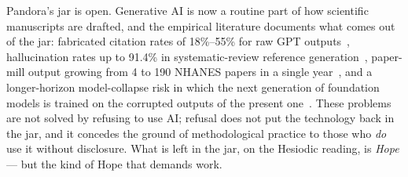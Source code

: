\documentclass[11pt,a4paper]{article}
\begin{document}
Pandora's jar is open. Generative AI is now a routine part of how
scientific manuscripts are drafted, and the empirical literature
documents what comes out of the jar: fabricated citation rates of
18\%--55\% for raw GPT outputs~\citep{walters2023fabricated},
hallucination rates up to 91.4\% in systematic-review reference
generation~\citep{chelli2024hallucination}, paper-mill output growing
from 4 to 190 NHANES papers in a single
year~\citep{suchak2025nhanes}, and a longer-horizon model-collapse
risk in which the next generation of foundation models is trained on
the corrupted outputs of the present
one~\citep{shumailov2024modelcollapse, seddik2024collapse}. These
problems are not solved by refusing to use AI; refusal does not put the
technology back in the jar, and it concedes the ground of methodological
practice to those who \emph{do} use it without disclosure. What is left
in the jar, on the Hesiodic reading, is \emph{Hope} --- but the kind of
Hope that demands work.
\end{document}
